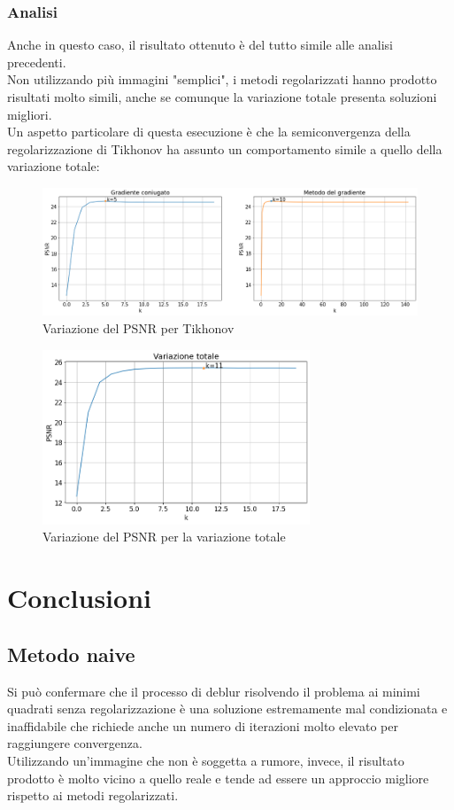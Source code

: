 \documentclass[11pt]{article}
\begin{document}
\subsubsection{Analisi}
Anche in questo caso, il risultato ottenuto è del tutto simile alle analisi precedenti.\\
Non utilizzando più immagini "semplici", i metodi regolarizzati hanno prodotto risultati molto simili, anche se comunque la variazione totale presenta soluzioni migliori.\\
Un aspetto particolare di questa esecuzione è che la semiconvergenza della regolarizzazione di Tikhonov ha assunto un comportamento simile a quello della variazione totale:
\begin{figure}[H]
    \centering
    \includegraphics[width=15cm]{reale/2/tikhonov_semiconvergenza.png}
    \caption{Variazione del PSNR per Tikhonov}
    \label{fig:semiconvergenza_tikhonov_reale2}
\end{figure}
\begin{figure}[H]
    \centering
    \includegraphics[width=8cm]{reale/2/tv_semiconvergenza.png}
    \caption{Variazione del PSNR per la variazione totale}
    \label{fig:semiconvergenza_tv_reale2}
\end{figure}


\newpage
\section{Conclusioni}
\subsection{Metodo naive}
Si può confermare che il processo di deblur risolvendo il problema ai minimi quadrati senza regolarizzazione è una soluzione estremamente mal condizionata e inaffidabile che richiede anche un numero di iterazioni molto elevato per raggiungere convergenza.\\
Utilizzando un'immagine che non è soggetta a rumore, invece, il risultato prodotto è molto vicino a quello reale e tende ad essere un approccio migliore rispetto ai metodi regolarizzati.
\end{document}
